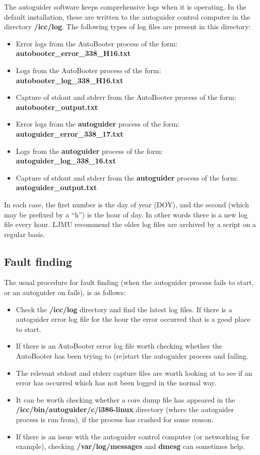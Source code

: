 \documentclass[10pt,a4paper]{article}
\begin{document}
The autoguider software keeps comprehensive logs when it is operating. In the default installation, these are written to the autoguider control computer in the directory {\bf /icc/log}. The following types of log files are present in this directory:

\begin{itemize}
\item Error logs from the AutoBooter process of the form: {\bf autobooter\_error\_338\_H16.txt}
\item Logs from the AutoBooter process of the form: {\bf autobooter\_log\_338\_H16.txt}
\item Capture of stdout and stderr from the AutoBooter process of the form: {\bf autobooter\_output.txt}
\item Error logs from the {\bf autoguider} process of the form: {\bf autoguider\_error\_338\_17.txt}
\item Logs from the {\bf autoguider} process of the form: {\bf autoguider\_log\_338\_16.txt}
\item Capture of stdout and stderr from the {\bf autoguider} process of the form: {\bf autoguider\_output.txt}
\end{itemize}

In each case, the first number is the day of year (DOY), and the second (which may be prefixed by a ``h'') is the hour of day. In other words there is a new log file every hour. LJMU recommend the older log files are archived by a script on a regular basis. 

\subsection{Fault finding}

The usual procedure for fault finding (when the autoguider process fails to start, or an autoguider on fails), is as follows:

\begin{itemize}
\item Check the {\bf /icc/log} directory and find the latest log files. If there is a autoguider error log file for the
hour the error occurred that is a good place to start.
\item If there is  an AutoBooter error log file worth checking whether the AutoBooter has been trying to (re)start the autoguider process and failing.
\item The relevant stdout and stderr capture files are worth looking at to see if an error has occurred which has not been logged in the normal way.
\item It can be worth checking whether a core dump file has appeared  in the {\bf /icc/bin/autoguider/c/i386-linux} directory (where the autoguider process is run from), if the process has crashed for some reason.
\item If there is an issue with the autoguider control computer (or networking for example), checking {\bf /var/log/messages} and {\bf dmesg} can sometimes help.
\end{itemize}
\end{document}
